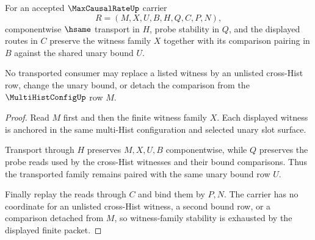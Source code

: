 \begin{theorem}
\label{thm:max-causal-rate-witness-family-stability}
For an accepted $\MaxCausalRateUp$ carrier
$$
R=(M,X,U,B,H,Q,C,P,N),
$$
componentwise $\hsame$ transport in $H$, probe stability in $Q$, and the displayed routes in $C$ preserve the witness family $X$ together with its comparison pairing in $B$ against the shared unary bound $U$.

No transported consumer may replace a listed witness by an unlisted cross-Hist row, change the unary bound, or detach the comparison from the $\MultiHistConfigUp$ row $M$.
\end{theorem}
\begin{proof}
Read $M$ first and then the finite witness family $X$. Each displayed witness is anchored in the same multi-Hist configuration and selected unary slot surface.

Transport through $H$ preserves $M,X,U,B$ componentwise, while $Q$ preserves the probe reads used by the cross-Hist witnesses and their bound comparisons. Thus the transported family remains paired with the same unary bound row $U$.

Finally replay the reads through $C$ and bind them by $P,N$. The carrier has no coordinate for an unlisted cross-Hist witness, a second bound row, or a comparison detached from $M$, so witness-family stability is exhausted by the displayed finite packet.
\end{proof}

